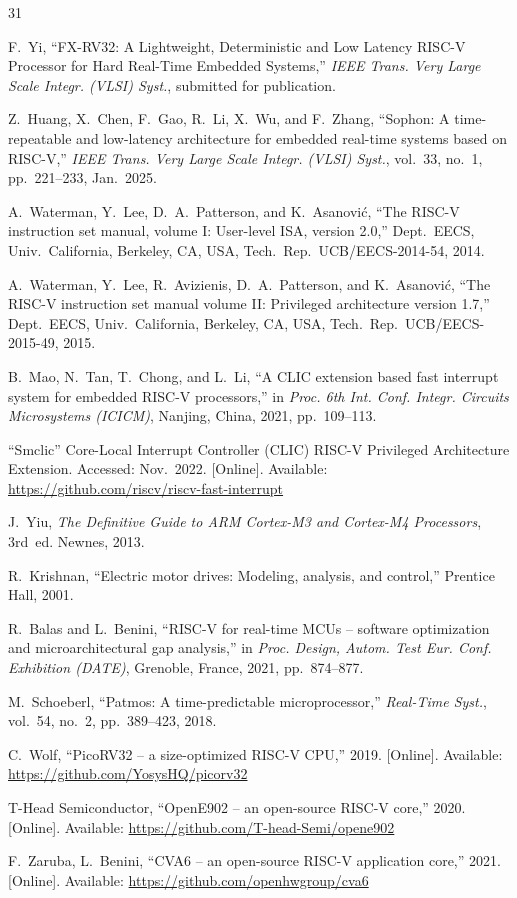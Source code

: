 \documentclass[letterpaper,journal]{IEEEtran}
\begin{document}
\begin{thebibliography}{31}

F.~Yi, ``FX-RV32: A Lightweight, Deterministic and Low Latency RISC-V Processor for Hard Real-Time Embedded Systems,'' \textit{IEEE Trans. Very Large Scale Integr. (VLSI) Syst.}, submitted for publication.

Z.~Huang, X.~Chen, F.~Gao, R.~Li, X.~Wu, and F.~Zhang, ``Sophon: A time-repeatable and low-latency architecture for embedded real-time systems based on RISC-V,'' \textit{IEEE Trans. Very Large Scale Integr. (VLSI) Syst.}, vol.~33, no.~1, pp.~221--233, Jan.~2025.

A.~Waterman, Y.~Lee, D.~A.~Patterson, and K.~Asanovi\'{c}, ``The RISC-V instruction set manual, volume I: User-level ISA, version 2.0,'' Dept.~EECS, Univ.~California, Berkeley, CA, USA, Tech.~Rep.~UCB/EECS-2014-54, 2014.

A.~Waterman, Y.~Lee, R.~Avizienis, D.~A.~Patterson, and K.~Asanovi\'{c}, ``The RISC-V instruction set manual volume II: Privileged architecture version 1.7,'' Dept.~EECS, Univ.~California, Berkeley, CA, USA, Tech.~Rep.~UCB/EECS-2015-49, 2015.

B.~Mao, N.~Tan, T.~Chong, and L.~Li, ``A CLIC extension based fast interrupt system for embedded RISC-V processors,'' in \textit{Proc. 6th Int. Conf. Integr. Circuits Microsystems (ICICM)}, Nanjing, China, 2021, pp.~109--113.

``Smclic'' Core-Local Interrupt Controller (CLIC) RISC-V Privileged Architecture Extension. Accessed: Nov.~2022. [Online]. Available: \url{https://github.com/riscv/riscv-fast-interrupt}

J.~Yiu, \textit{The Definitive Guide to ARM Cortex-M3 and Cortex-M4 Processors}, 3rd~ed. Newnes, 2013.

R.~Krishnan, ``Electric motor drives: Modeling, analysis, and control,'' Prentice Hall, 2001.

R.~Balas and L.~Benini, ``RISC-V for real-time MCUs -- software optimization and microarchitectural gap analysis,'' in \textit{Proc. Design, Autom. Test Eur. Conf. Exhibition (DATE)}, Grenoble, France, 2021, pp.~874--877.

M.~Schoeberl, ``Patmos: A time-predictable microprocessor,'' \textit{Real-Time Syst.}, vol.~54, no.~2, pp.~389--423, 2018.

C.~Wolf, ``PicoRV32 -- a size-optimized RISC-V CPU,'' 2019. [Online]. Available: \url{https://github.com/YosysHQ/picorv32}

T-Head Semiconductor, ``OpenE902 -- an open-source RISC-V core,'' 2020. [Online]. Available: \url{https://github.com/T-head-Semi/opene902}

F.~Zaruba, L.~Benini, ``CVA6 -- an open-source RISC-V application core,'' 2021. [Online]. Available: \url{https://github.com/openhwgroup/cva6}

\end{thebibliography}
\end{document}
